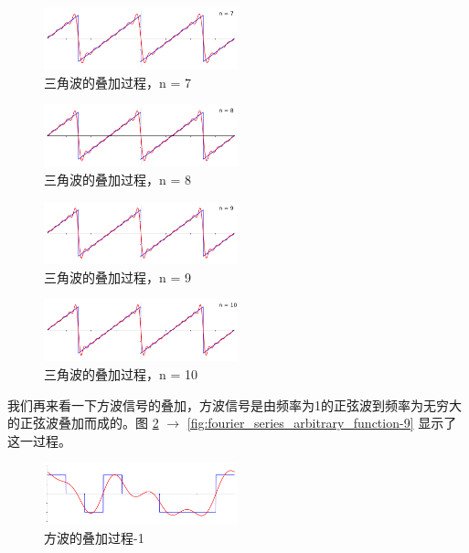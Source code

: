 \documentclass[lang=cn,newtx,10pt,scheme=chinese]{elegantbook}
\begin{document}
\begin{figure}[!htb]
\centering
\includegraphics[width=0.5\textwidth]{fourier_series_triangle-6.png}
\caption{三角波的叠加过程，n = 7}
\end{figure}

\begin{figure}[!htb]
\centering
\includegraphics[width=0.5\textwidth]{fourier_series_triangle-7.png}
\caption{三角波的叠加过程，n = 8}
\end{figure}

\begin{figure}[!htb]
\centering
\includegraphics[width=0.5\textwidth]{fourier_series_triangle-8.png}
\caption{三角波的叠加过程，n = 9}
\end{figure}

\begin{figure}[!htb]
\centering
\includegraphics[width=0.5\textwidth]{fourier_series_triangle-9.png}
\caption{三角波的叠加过程，n = 10}
\label{fig:fourier_series_triangle-9}
\end{figure}

我们再来看一下方波信号的叠加，方波信号是由频率为1的正弦波到频率为无穷大的正弦波叠加而成的。图 \ref{fig:fourier_series_arbitrary_function-0} $\rightarrow$ \ref{fig:fourier_series_arbitrary_function-9} 显示了这一过程。

\begin{figure}[!htb]
\centering
\includegraphics[width=0.5\textwidth]{fourier_series_arbitrary_function-0.png}
\caption{方波的叠加过程-1}
\label{fig:fourier_series_arbitrary_function-0}
\end{figure}
\end{document}
